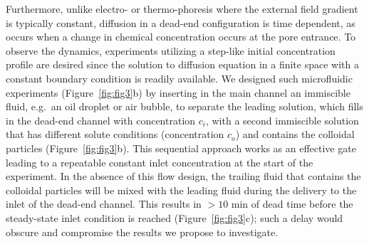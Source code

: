 \documentclass[11pt]{article}
\begin{document}
Furthermore, unlike electro- or thermo-phoresis where the external field
gradient is typically constant, diffusion in a dead-end configuration is
time dependent, as occurs when a change in chemical concentration occurs
at the pore entrance. To observe the dynamics, experiments utilizing a
step-like initial concentration profile are desired since the solution
to diffusion equation in a finite space with a constant boundary
condition is readily available.   We designed such microfluidic experiments
(Figure~\ref{fig:fig3}b) by inserting in the main channel an
immiscible fluid, e.g.~an oil droplet or air bubble, to separate the
leading solution, which fills in the dead-end channel with concentration
$c_i$, with a second immiscible solution that has different solute
conditions (concentration $c_o$) and contains the colloidal particles
(Figure~\ref{fig:fig3}b). This sequential approach works as an effective
gate leading to a repeatable constant inlet concentration at the start
of the experiment. In the absence of this flow design, the trailing
fluid that contains the colloidal particles will be mixed with the
leading fluid during the delivery to the inlet of the dead-end channel.
This results in $> 10$ min of dead time before the steady-state inlet
condition is reached (Figure~\ref{fig:fig3}c); such a delay would
obscure and compromise the results we propose to investigate.

\end{document}
